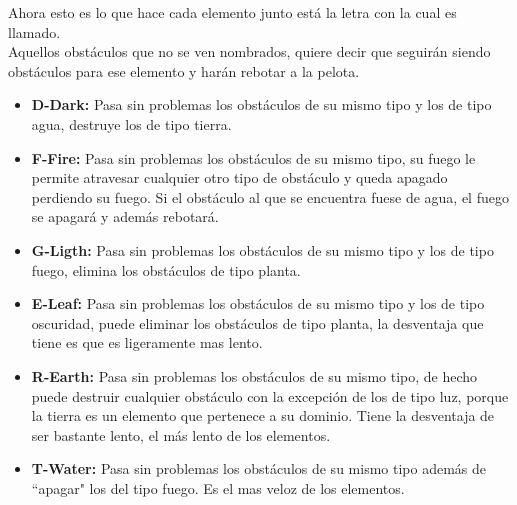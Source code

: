 \documentclass[10pt]{article}
\begin{document}
{\begin{flushleft}
\newpage
Ahora esto es lo que hace cada elemento junto est\'a la letra con la cual es llamado.\\
Aquellos obst\'aculos que no se ven nombrados, quiere decir que seguir\'an siendo obst\'aculos para ese elemento y har\'an rebotar a la pelota.
\begin{itemize}
\item{}\textbf{D-Dark:} Pasa sin problemas los obst\'aculos de su mismo tipo y los de tipo agua, destruye los de tipo tierra.
\item{}\textbf{F-Fire:} Pasa sin problemas los obst\'aculos de su mismo tipo, su fuego le permite atravesar cualquier otro tipo de obst\'aculo y queda apagado perdiendo su fuego. Si el obst\'aculo al que se encuentra fuese de agua, el fuego se apagar\'a y adem\'as rebotar\'a.
\item{}\textbf{G-Ligth:} Pasa sin problemas los obst\'aculos de su mismo tipo y los de tipo fuego, elimina los obst\'aculos de tipo planta.
\item{}\textbf{E-Leaf:} Pasa sin problemas los obst\'aculos de su mismo tipo y los de tipo oscuridad, puede eliminar los obst\'aculos de tipo planta, la desventaja que tiene es que es ligeramente mas lento.
\item{}\textbf{R-Earth:} Pasa sin problemas los obst\'aculos de su mismo tipo, de hecho puede destruir cualquier obst\'aculo con la excepci\'on de los de tipo luz, porque la tierra es un elemento que pertenece a su dominio. Tiene la desventaja de ser bastante lento, el m\'as lento de los elementos.
\item{}\textbf{T-Water:} Pasa sin problemas los obst\'aculos de su mismo tipo adem\'as de ``apagar" los del tipo fuego. Es el mas veloz de los elementos.
\end{itemize}
\end{flushleft}

\newpage
\begin{flushleft}

\end{flushleft}}
\end{document}

